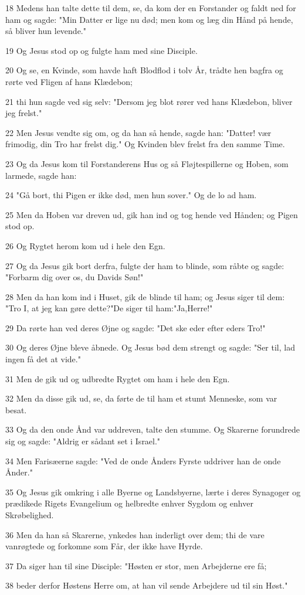 \par 18 Medens han talte dette til dem, se, da kom der en Forstander og faldt ned for ham og sagde: "Min Datter er lige nu død; men kom og læg din Hånd på hende, så bliver hun levende."
\par 19 Og Jesus stod op og fulgte ham med sine Disciple.
\par 20 Og se, en Kvinde, som havde haft Blodflod i tolv År, trådte hen bagfra og rørte ved Fligen af hans Klædebon;
\par 21 thi hun sagde ved sig selv: "Dersom jeg blot rører ved hans Klædebon, bliver jeg frelst."
\par 22 Men Jesus vendte sig om, og da han så hende, sagde han: "Datter! vær frimodig, din Tro har frelst dig." Og Kvinden blev frelst fra den samme Time.
\par 23 Og da Jesus kom til Forstanderens Hus og så Fløjtespillerne og Hoben, som larmede, sagde han:
\par 24 "Gå bort, thi Pigen er ikke død, men hun sover." Og de lo ad ham.
\par 25 Men da Hoben var dreven ud, gik han ind og tog hende ved Hånden; og Pigen stod op.
\par 26 Og Rygtet herom kom ud i hele den Egn.
\par 27 Og da Jesus gik bort derfra, fulgte der ham to blinde, som råbte og sagde: "Forbarm dig over os, du Davids Søn!"
\par 28 Men da han kom ind i Huset, gik de blinde til ham; og Jesus siger til dem: "Tro I, at jeg kan gøre dette?"De siger til ham:"Ja,Herre!"
\par 29 Da rørte han ved deres Øjne og sagde: "Det ske eder efter eders Tro!"
\par 30 Og deres Øjne bleve åbnede. Og Jesus bød dem strengt og sagde: "Ser til, lad ingen få det at vide."
\par 31 Men de gik ud og udbredte Rygtet om ham i hele den Egn.
\par 32 Men da disse gik ud, se, da førte de til ham et stumt Menneske, som var besat.
\par 33 Og da den onde Ånd var uddreven, talte den stumme. Og Skarerne forundrede sig og sagde: "Aldrig er sådant set i Israel."
\par 34 Men Farisæerne sagde: "Ved de onde Ånders Fyrste uddriver han de onde Ånder."
\par 35 Og Jesus gik omkring i alle Byerne og Landsbyerne, lærte i deres Synagoger og prædikede Rigets Evangelium og helbredte enhver Sygdom og enhver Skrøbelighed.
\par 36 Men da han så Skarerne, ynkedes han inderligt over dem; thi de vare vanrøgtede og forkomne som Får, der ikke have Hyrde.
\par 37 Da siger han til sine Disciple: "Høsten er stor, men Arbejderne ere få;
\par 38 beder derfor Høstens Herre om, at han vil sende Arbejdere ud til sin Høst."

